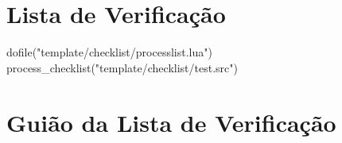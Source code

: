 \tableofcontents
\newpage

\section{Lista de Verificação}\label{sec:lista-de-verificacao}
\begin{small}
\begin{luacode}
dofile("template/checklist/processlist.lua")
process_checklist("template/checklist/test.src")
\end{luacode}
\end{small}
\newpage

\section{Guião da Lista de Verificação}\label{sec:guiao-da-lista-de-verificacao}
\newpage

\printbibliography[title={Referências}]